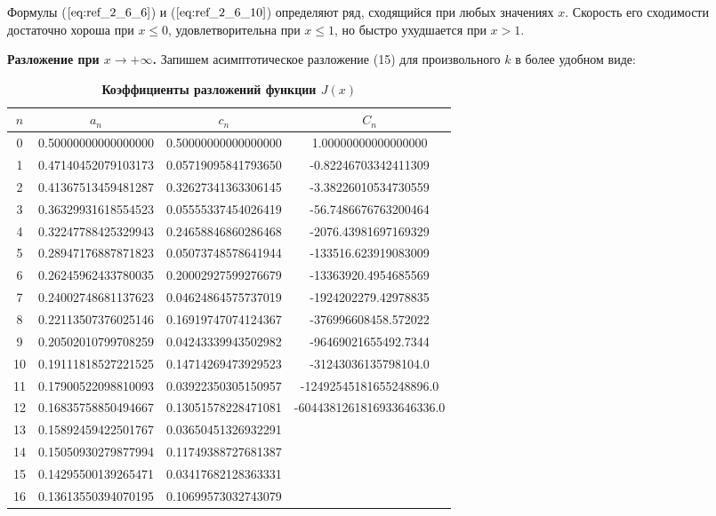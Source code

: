 Формулы ($\ref{eq:ref_2_6_6}$) и ($\ref{eq:ref_2_6_10}$) определяют ряд, сходящийся при любых значениях $x$.
Скорость его сходимости достаточно хороша при $x \leqslant 0$, удовлетворительна при
$x \leqslant 1$, но быстро ухудшается при $x > 1$.

\textbf{Разложение при $x \to +\infty$.} Запишем асимптотическое разложение (15) для
произвольного $k$ в более удобном виде:

\begin{table}[]
\caption{\textbf{Коэффициенты разложений функции $J(x)$}}
\begin{center}
\begin{tabular}{|c|c|c|c|}
\hline
$n$ & $a_n$ & $c_n$ & $C_n$ \\
\hline
0 & 0.50000000000000000 & 0.50000000000000000 & 1.00000000000000000 \\
1 & 0.47140452079103173 & 0.05719095841793650 & -0.82246703342411309 \\
2 & 0.41367513459481287 & 0.32627341363306145 & -3.38226010534730559 \\
3 & 0.36329931618554523 & 0.05555337454026419 & -56.7486676763200464 \\
4 & 0.32247788425329943 & 0.24658846860286468 & -2076.43981697169329 \\
5 & 0.28947176887871823 & 0.05073748578641944 & -133516.623919083009 \\
6 & 0.26245962433780035 & 0.20002927599276679 & -13363920.4954685569 \\
7 & 0.24002748681137623 & 0.04624864575737019 & -1924202279.42978835 \\
8 & 0.22113507376025146 & 0.16919747074124367 & -376996608458.572022 \\
9 & 0.20502010799708259 & 0.04243339943502982 & -96469021655492.7344 \\
10 & 0.19111818527221525 & 0.14714269473929523 & -31243036135798104.0  \\
11 & 0.17900522098810093 & 0.03922350305150957 & -12492545181655248896.0 \\
12 & 0.16835758850494667 & 0.13051578228471081 & -6044381261816933646336.0 \\
13 & 0.15892459422501767 & 0.03650451326932291 &                      \\
14 & 0.15050930279877994 & 0.11749388727681387 &                      \\
15 & 0.14295500139265471 & 0.03417682128363331 &                      \\
16 & 0.13613550394070195 & 0.10699573032743079 &                      \\

\end{tabular}
\end{center}
\end{table}

